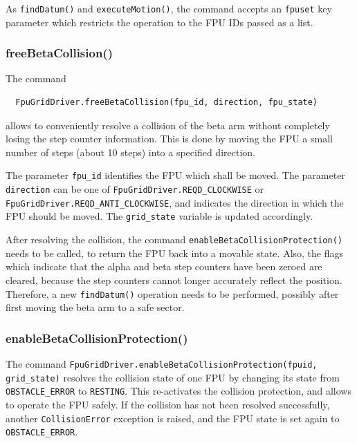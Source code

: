 \documentclass[11pt,a4paper]{scrartcl}
\begin{document}
As \texttt{findDatum()} and \texttt{executeMotion()}, the command
accepts an \texttt{fpuset} key parameter which restricts the operation
to the FPU IDs passed as a list.

\subsubsection{freeBetaCollision()}

The command
\begin{verbatim}
  FpuGridDriver.freeBetaCollision(fpu_id, direction, fpu_state)
\end{verbatim}
allows to conveniently resolve a collision
of the beta arm without completely losing the step counter
information. This is done by moving the FPU a small number of steps
(about 10 steps) into a specified direction.

\begin{sloppypar}
The parameter \texttt{fpu\_id} identifies the FPU which shall be
moved. The parameter \texttt{direction} can be one of
\texttt{FpuGridDriver.REQD\_CLOCKWISE} or
\texttt{FpuGridDriver.REQD\_ANTI\_CLOCKWISE}, and indicates the
direction in which the FPU should be moved. The \texttt{grid\_state}
variable is updated accordingly.
\end{sloppypar}

After resolving the collision, the command
\texttt{enableBetaCollisionProtection()} needs to be called, to return
the FPU back into a movable state.  Also, the flags which indicate
that the alpha and beta step counters have been zeroed are cleared,
because the step counters cannot longer accurately reflect the
position. Therefore, a new \texttt{findDatum()} operation needs to be
performed, possibly after first moving the beta arm to a safe sector.



\subsubsection{enableBetaCollisionProtection()}

The command \texttt{FpuGridDriver.enableBetaCollisionProtection(fpuid,
  grid\_state)} resolves the collision state of one FPU by changing
its state from \texttt{OBSTACLE\_ERROR} to \texttt{RESTING}.  This
re-activates the collision protection, and allows to operate the FPU
safely. If the collision has not been resolved successfully, another
\texttt{CollisionError} exception is raised, and the FPU state is set
again to \texttt{OBSTACLE\_ERROR}.
\end{document}
